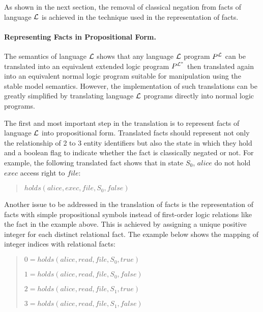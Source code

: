 \documentclass[10pt, twocolumn]{article}
\begin{document}
          As shown in the next section, the removal of classical negation from
          facts of language $\cal{L}$ is achieved in the technique used in the
          representation of facts.

        \paragraph{Representing Facts in Propositional Form.}

          The semantics of language ${\cal L}$ shows that any language
          ${\cal L}$ program $P^{\cal L}$ can be translated into an equivalent
          extended logic program $P^{\cal{L^{*}}}$ then translated again into
          an equivalent normal logic program suitable for manipulation using
          the stable model semantics. However, the implementation of such
          translations can be greatly simplified by translating language
          ${\cal L}$ programs directly into normal logic programs.

          The first and most important step in the translation is to represent
          facts of language ${\cal L}$ into propositional form. Translated
          facts should represent not only the relationship of 2 to 3 entity
          identifiers but also the state in which they hold and a boolean flag
          to indicate whether the fact is classically negated or not. For
          example, the following translated fact shows that in state $S_{0}$,
          $alice$ do not hold $exec$ access right to $file$:

          \begin{quote}
            $holds(alice, exec, file, S_{0}, false)$
          \end{quote}

          Another issue to be addressed in the translation of facts is the
          representation of facts with simple propositional symbols instead
          of first-order logic relations like the fact in the example above.
          This is achieved by assigning a unique positive integer for each
          distinct relational fact. The example below shows the mapping of
          integer indices with relational facts:

          \begin{quote}
            $0 = holds(alice, read, file, S_{0}, true)$

            $1 = holds(alice, read, file, S_{0}, false)$

            $2 = holds(alice, read, file, S_{1}, true)$

            $3 = holds(alice, read, file, S_{1}, false)$
          \end{quote}
\end{document}
